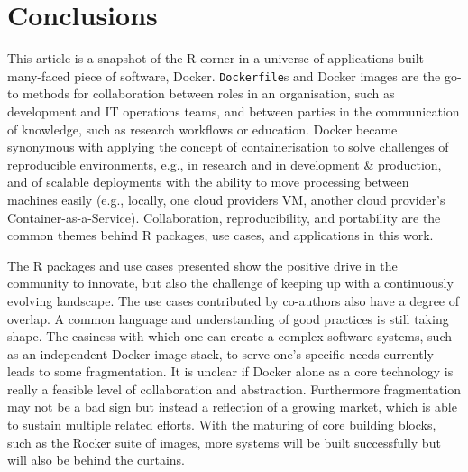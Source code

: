 \hypertarget{conclusions}{%
\section{Conclusions}\label{conclusions}}

This article is a snapshot of the R-corner in a universe of applications
built many-faced piece of software, Docker. \texttt{Dockerfile}s and
Docker images are the go-to methods for collaboration between roles in
an organisation, such as development and IT operations teams, and
between parties in the communication of knowledge, such as research
workflows or education. Docker became synonymous with applying the
concept of containerisation to solve challenges of reproducible
environments, e.g., in research and in development \& production, and of
scalable deployments with the ability to move processing between
machines easily (e.g., locally, one cloud providers VM, another cloud
provider's Container-as-a-Service). Collaboration, reproducibility, and
portability are the common themes behind R packages, use cases, and
applications in this work.

The R packages and use cases presented show the positive drive in the
community to innovate, but also the challenge of keeping up with a
continuously evolving landscape. The use cases contributed by co-authors
also have a degree of overlap. A common language and understanding of
good practices is still taking shape. The easiness with which one can
create a complex software systems, such as an independent Docker image
stack, to serve one's specific needs currently leads to some
fragmentation. It is unclear if Docker alone as a core technology is
really a feasible level of collaboration and abstraction. Furthermore
fragmentation may not be a bad sign but instead a reflection of a
growing market, which is able to sustain multiple related efforts. With
the maturing of core building blocks, such as the Rocker suite of
images, more systems will be built successfully but will also be behind
the curtains.

